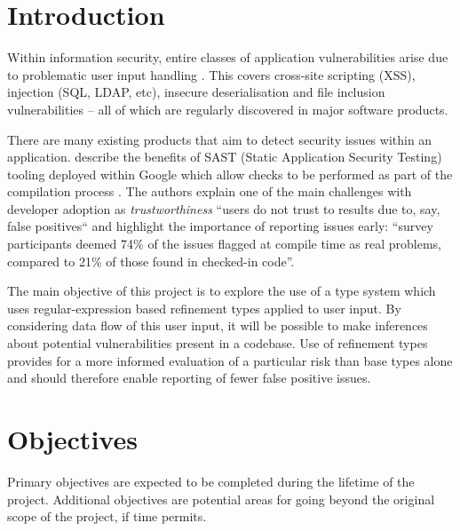 \documentclass[a4paper]{article}
\title{}
\author{}
\newcommand{\infobox}[1] {\colorbox{infogreenlight}{\parbox{\textwidth}{\vspace{.75\baselineskip}\centering\parbox{0.95\textwidth}{\faicon{info-circle} #1\vspace{.75\baselineskip}}}}}
\begin{document}
    
    
    \section*{Introduction}
    
    Within information security, entire classes of application vulnerabilities arise due to problematic user input handling \citep{christey2007vulnerability}. This covers cross-site scripting (XSS), injection (SQL, LDAP, etc), insecure
    deserialisation and file inclusion vulnerabilities -- all of which are regularly discovered in major software products.
    
    There are many existing products that aim to detect security issues within an application. \citeauthor{Sadowski:2018:LBS:3200906.3188720} describe the benefits of SAST (Static Application Security Testing) tooling deployed within Google which allow checks to be performed as part of the compilation process \citeyearpar{Sadowski:2018:LBS:3200906.3188720}. The authors explain one of the main challenges with developer adoption as \emph{trustworthiness} ``users do not trust to results due to, say, false positives`` and highlight the importance of reporting issues early: ``survey participants deemed 74\% of the issues flagged at compile time as real problems, compared to 21\% of those found in checked-in code''. 
    
    The main objective of this project is to explore the use of a type system which uses regular-expression based refinement types applied to user input. By considering data flow of this user input, it will be possible to make inferences about potential vulnerabilities present in a codebase. Use of refinement types provides for a more informed evaluation of a particular risk than base types alone and should therefore enable reporting of fewer false positive issues.
    
    \section*{Objectives}
    
    \infobox{Primary objectives are expected to be completed during the lifetime of the project. Additional objectives are potential areas for going beyond the original scope of the project, if time permits.}
    
\end{document}
